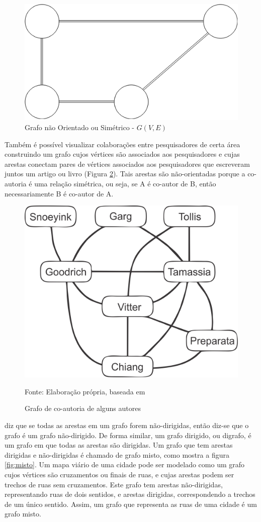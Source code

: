\begin{figure}[htbp]
\centering
 \includegraphics[width=.35\textwidth]{chapters/fig/simetrico1.png}
\caption{Grafo não Orientado ou Simétrico - $G(V,E)$}
\label{fig:simetrico}
\end{figure}
\FloatBarrier

Também é possível visualizar colaborações entre pesquisadores de certa área construindo um grafo cujos vértices são
associados aos pesquisadores e cujas arestas conectam pares de vértices associados aos pesquisadores
que escreveram juntos um artigo ou livro (Figura \ref{fig:goodrich}). Tais arestas são não-orientadas porque
a co-autoria é uma relação simétrica, ou seja, se A é co-autor de B, então necessariamente B é co-autor de A.

\begin{figure}[htbp]
\centering
 \includegraphics[width=.35\textwidth]{chapters/fig/goodrich.png}
\caption{Grafo de co-autoria de alguns autores}
Fonte: Elaboração própria, baseada em \cite{goodrich}
\label{fig:goodrich}
\end{figure}
\FloatBarrier


\cite{goodrich} diz que se todas as arestas em um grafo forem não-dirigidas,
então diz-se que o grafo é um grafo não-dirigido. De forma similar, um grafo dirigido, ou digrafo, é um grafo em
que todas as arestas são dirigidas. Um grafo que tem arestas dirigidas e não-dirigidas é chamado de grafo misto, 
como mostra a figura \ref{fig:misto}.
Um mapa viário de uma cidade pode ser modelado como um grafo cujos vértices são cruzamentos ou finais de ruas, e cujas arestas
podem ser trechos de ruas sem cruzamentos. Este grafo tem arestas não-dirigidas, representando ruas de dois sentidos,
e arestas dirigidas, correspondendo a trechos de um único sentido. Assim, um grafo que representa as ruas de uma cidade
é um grafo misto.


